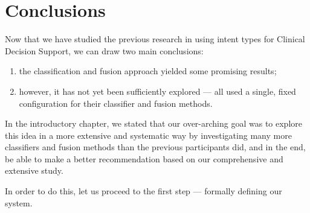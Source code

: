 \section{Conclusions}
Now that we have studied the previous research in
using intent types for Clinical Decision Support, we can draw two main conclusions:
\begin{enumerate}
 \item the classification and fusion approach yielded some promising results;
 \item however, it has not yet been sufficiently explored --- \cite{choi, FDUMedSearch, soldani, limsi2015}
 all used a single, fixed configuration for their classifier and fusion methods.
\end{enumerate}

In the introductory chapter, we stated that our over-arching goal was to
explore this idea in a more extensive and systematic way by investigating
many more classifiers and fusion methods than the previous participants did, and in the end,
be able to make a better recommendation based on our comprehensive and extensive study.

In order to do this, let us proceed to the first step --- formally defining our system.


